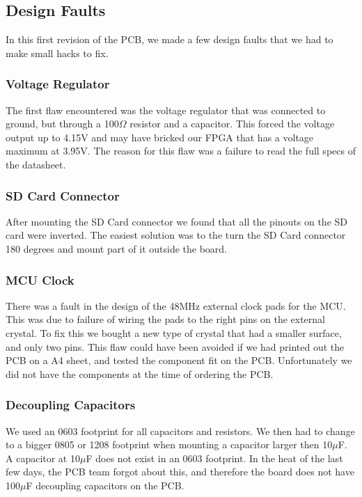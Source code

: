 \subsection{Design Faults}
In this first revision of the PCB, we made a few design faults that we had to make small hacks to fix.

\subsubsection{Voltage Regulator}
The first flaw encountered was the voltage regulator that was connected to ground, but through a 100$\Omega$ resistor and a capacitor.
This forced the voltage output up to 4.15V and may have bricked our FPGA that has a voltage maximum at 3.95V.
The reason for this flaw was a failure to read the full specs of the datasheet.

\subsubsection{SD Card Connector}
After mounting the SD Card connector we found that all the pinouts on the SD card were inverted.
The easiest solution was to the turn the SD Card connector 180 degrees and mount part of it outside the board.

\subsubsection{MCU Clock}
There was a fault in the design of the 48MHz external clock pads for the MCU. This was due to failure of wiring the pads to the right pins on the external crystal.
To fix this we bought a new type of crystal that had a smaller surface, and only two pins.
This flaw could have been avoided if we had printed out the PCB on a A4 sheet, and tested the component fit on the PCB.
Unfortunately we did not have the components at the time of ordering the PCB.

\subsubsection{Decoupling Capacitors}
We used an 0603 footprint for all capacitors and resistors.
We then had to change to a bigger 0805 or 1208 footprint when mounting a capacitor larger then 10$\mu$F.
A capacitor at 10$\mu$F does not exist in an 0603 footprint.
In the heat of the last few days, the PCB team forgot about this, and therefore the board does not have 100$\mu$F decoupling capacitors on the PCB.

